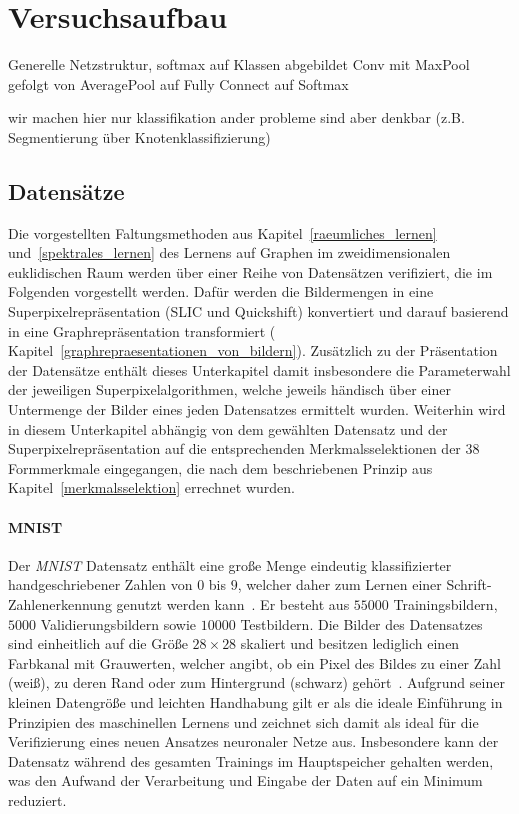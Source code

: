 \section{Versuchsaufbau}
\label{versuchsaufbau}

Generelle Netzstruktur, softmax auf Klassen abgebildet
Conv mit MaxPool gefolgt von AveragePool auf Fully Connect auf Softmax

wir machen hier nur klassifikation
ander probleme sind aber denkbar (z.B. Segmentierung über Knotenklassifizierung)

\subsection{Datensätze}
\label{datensaetze}

Die vorgestellten Faltungsmethoden aus Kapitel~\ref{raeumliches_lernen} und~\ref{spektrales_lernen} \bzgl{} des Lernens auf Graphen im zweidimensionalen euklidischen Raum werden über einer Reihe von Datensätzen verifiziert, die im Folgenden vorgestellt werden.
Dafür werden die Bildermengen in eine Superpixelrepräsentation (\gls{SLIC} und Quickshift) konvertiert und darauf basierend in eine Graphrepräsentation transformiert (\vgl{} Kapitel~\ref{graphrepraesentationen_von_bildern}).
Zusätzlich zu der Präsentation der Datensätze enthält dieses Unterkapitel damit insbesondere die Parameterwahl der jeweiligen Superpixelalgorithmen, welche jeweils händisch über einer Untermenge der Bilder eines jeden Datensatzes ermittelt wurden.
Weiterhin wird in diesem Unterkapitel abhängig von dem gewählten Datensatz und der Superpixelrepräsentation auf die entsprechenden Merkmalsselektionen der $38$ Formmerkmale eingegangen, die nach dem beschriebenen Prinzip aus Kapitel~\ref{merkmalsselektion} errechnet wurden.

\paragraph{MNIST}
\label{mnist}

Der \emph{\gls{MNIST}} Datensatz enthält eine große Menge eindeutig klassifizierter handgeschriebener Zahlen von $0$ bis $9$, welcher daher zum Lernen einer Schrift- \bzw{} Zahlenerkennung genutzt werden kann~\cite{mnist}.
Er besteht aus $55000$ Trainingsbildern, $5000$ Validierungsbildern sowie $10000$ Testbildern.
Die Bilder des Datensatzes sind einheitlich auf die Größe $28 \times 28$ skaliert und besitzen lediglich einen Farbkanal mit Grauwerten, welcher angibt, ob ein Pixel des Bildes zu einer Zahl (weiß), zu deren Rand oder zum Hintergrund (schwarz) gehört~\cite{mnist}.
Aufgrund seiner kleinen Datengröße und leichten Handhabung gilt er als die ideale Einführung in Prinzipien des maschinellen Lernens und zeichnet sich damit als ideal für die Verifizierung eines neuen Ansatzes \bzgl{} neuronaler Netze aus.
Insbesondere kann der Datensatz während des gesamten Trainings im Hauptspeicher gehalten werden, was den Aufwand \bzgl{} der Verarbeitung und Eingabe der Daten auf ein Minimum reduziert.


